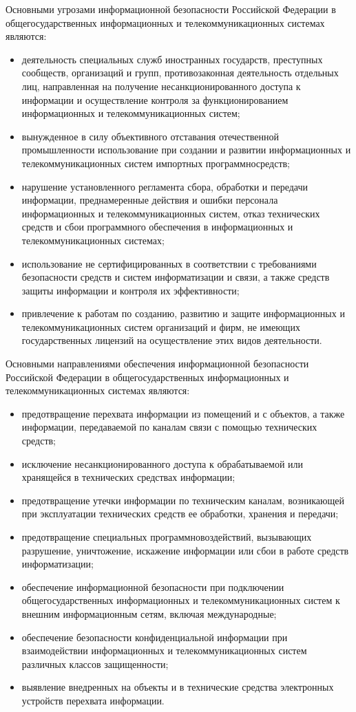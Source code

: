 Основными угрозами информационной безопасности Российской Федерации в общегосударственных информационных и телекоммуникационных системах являются:
\begin{itemize}
	\item деятельность специальных служб иностранных государств, преступных сообществ, организаций и групп, противозаконная деятельность отдельных лиц, направленная на получение несанкционированного доступа к информации и осуществление контроля за функционированием информационных и телекоммуникационных систем;
	\item вынужденное в силу объективного отставания отечественной промышленности использование при создании и развитии информационных и телекоммуникационных систем импортных программно средств;
	\item нарушение установленного регламента сбора, обработки и передачи информации, преднамеренные действия и ошибки персонала информационных и телекоммуникационных систем, отказ технических средств и сбои программного обеспечения в информационных и телекоммуникационных системах;
	\item использование не сертифицированных в соответствии с требованиями безопасности средств и систем информатизации и связи, а также средств защиты информации и контроля их эффективности;
	\item привлечение к работам по созданию, развитию и защите информационных и телекоммуникационных систем организаций и фирм, не имеющих государственных лицензий на осуществление этих видов деятельности.
\end{itemize}

Основными направлениями обеспечения информационной безопасности Российской Федерации в общегосударственных информационных и телекоммуникационных системах являются:
\begin{itemize}
	\item предотвращение перехвата информации из помещений и с объектов, а также информации, передаваемой по каналам связи с помощью технических средств;
	\item исключение несанкционированного доступа к обрабатываемой или хранящейся в технических средствах информации;
	\item предотвращение утечки информации по техническим каналам, возникающей при эксплуатации технических средств ее обработки, хранения и передачи;
	\item предотвращение специальных программно воздействий, вызывающих разрушение, уничтожение, искажение информации или сбои в работе средств информатизации;
	\item обеспечение информационной безопасности при подключении общегосударственных информационных и телекоммуникационных систем к внешним информационным сетям, включая международные;
	\item обеспечение безопасности конфиденциальной информации при взаимодействии информационных и телекоммуникационных систем различных классов защищенности;
	\item выявление внедренных на объекты и в технические средства электронных устройств перехвата информации.
\end{itemize}

